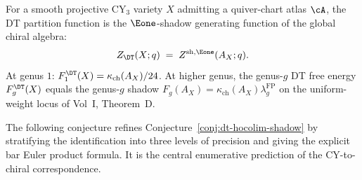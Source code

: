 \begin{conjecture}[DT = descent shadow]
\label{conj:dt-hocolim-shadow}
\ClaimStatusConjectured
For a smooth projective CY$_3$ variety $X$ admitting a quiver-chart atlas $\cA$, the DT partition function is the $\Eone$-shadow generating function of the global chiral algebra:
\begin{equation}
\label{eq:dt-shadow}
 Z_{\DT}(X; q) \;=\; Z^{\mathrm{sh},\Eone}(A_X; q).
\end{equation}
At genus $1$: $F_1^{\DT}(X) = \kappa_{\mathrm{ch}}(A_X)/24$. At higher genus, the genus-$g$ DT free energy $F_g^{\DT}(X)$ equals the genus-$g$ shadow \(F_g(A_X) = \kappa_{\mathrm{ch}}(A_X)\lambda_g^{\mathrm{FP}}\) on the uniform-weight locus of Vol~I, Theorem~D.
\end{conjecture}


The following conjecture refines Conjecture~\ref{conj:dt-hocolim-shadow} by stratifying the identification into three levels of precision and giving the explicit bar Euler product formula. It is the central enumerative prediction of the CY-to-chiral correspondence.


